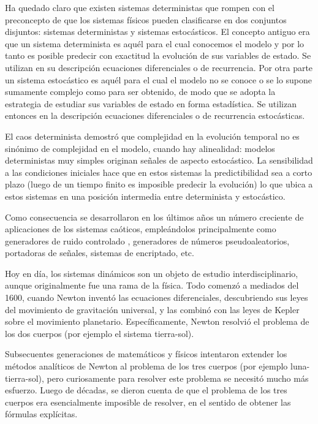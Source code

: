 Ha quedado claro que existen sistemas deterministas que rompen con el preconcepto de que los sistemas físicos pueden clasificarse en dos conjuntos disjuntos: sistemas deterministas y sistemas estocásticos.
El concepto antiguo era que un sistema determinista es aquél para el cual conocemos el modelo y por lo tanto es posible predecir con exactitud la evolución de sus variables de estado.
Se utilizan en su descripción ecuaciones diferenciales o de recurrencia.
Por otra parte un sistema estocástico es aquél para el cual el modelo no se conoce o se lo supone sumamente complejo como para ser obtenido, de modo que se adopta la estrategia de estudiar sus variables de estado en forma estadística.
Se utilizan entonces en la descripción ecuaciones diferenciales o de recurrencia estocásticas.

El caos determinista demostró que complejidad en la evolución temporal no es sinónimo de complejidad en el modelo, cuando hay alinealidad: modelos deterministas muy simples originan señales de aspecto estocástico.
La sensibilidad a las condiciones iniciales hace que en estos sistemas la predictibilidad sea a corto plazo (luego de un tiempo finito es imposible predecir la evolución) lo que ubica a estos sistemas en una posición intermedia entre determinista y estocástico.

Como consecuencia se desarrollaron en los últimos años un número creciente de aplicaciones de los sistemas caóticos, empleándolos principalmente como generadores de ruido controlado \cite{}, generadores de números pseudoaleatorios, portadoras de señales, sistemas de encriptado, etc.

Hoy en día, los sistemas dinámicos son un objeto de estudio interdisciplinario, aunque originalmente fue una rama de la física.
Todo comenzó a mediados del 1600, cuando Newton inventó las ecuaciones diferenciales, descubriendo sus leyes del movimiento de gravitación universal, y las combinó con las leyes de Kepler sobre el movimiento planetario.
Específicamente, Newton resolvió el problema de los dos cuerpos (por ejemplo el sistema tierra-sol).

Subsecuentes generaciones de matemáticos y físicos intentaron extender los métodos analíticos de Newton al problema de los tres cuerpos (por ejemplo luna-tierra-sol), pero curiosamente para resolver este problema se necesitó mucho más esfuerzo.
Luego de décadas, se dieron cuenta de que el problema de los tres cuerpos era esencialmente imposible de resolver, en el sentido de obtener las fórmulas explícitas.

